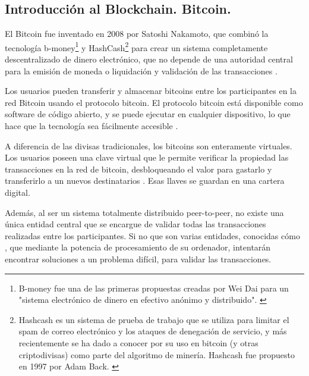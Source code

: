 \newpage

\subsection{Introducción al Blockchain. Bitcoin.}

El Bitcoin fue inventado en 2008 por Satoshi Nakamoto, que combinó la tecnología b-money\footnote{B-money 
fue una de las primeras propuestas creadas por Wei Dai para un "sistema electrónico de dinero en efectivo anónimo y 
distribuido". \label{fnlabel}} y HashCash\footnote{Hashcash es un sistema de prueba de trabajo que se utiliza para 
limitar el spam de correo electrónico y los ataques de denegación de servicio, y más recientemente se ha dado a 
conocer por su uso en bitcoin (y otras criptodivisas) como parte del algoritmo de minería. Hashcash fue propuesto 
en 1997 por Adam Back. \label{fnlabel}} para crear un sistema completamente descentralizado de dinero  electrónico, 
que no depende de una autoridad central para la emisión de moneda o liquidación y validación de las transacciones 
\cite{antonopoulos2014mastering, bmoney, hashcash}.

\vspace{5mm}

\noindent Los usuarios pueden transferir y almacenar bitcoins entre los participantes en la red Bitcoin usando el 
protocolo bitcoin. El protocolo bitcoin está disponible como software de código abierto, y se puede ejecutar en 
cualquier dispositivo, lo que hace que la tecnología sea fácilmente accesible \cite{antonopoulos2014mastering}.

\vspace{5mm}

\noindent A diferencia de las divisas tradicionales, los bitcoins son enteramente virtuales. Los usuarios poseen una 
clave virtual que le permite verificar la propiedad las transacciones en la red de bitcoin, desbloqueando el valor para 
gastarlo y transferirlo a un nuevos destinatarios \cite{antonopoulos2014mastering}. Esas llaves se guardan en una 
cartera digital. 

\vspace{5mm}

\noindent Además, al ser un sistema totalmente distribuido peer-to-peer, no existe una única entidad central que se 
encargue de validar todas las transacciones realizadas entre los participantes. Si no que son varias entidades, 
conocidas cómo , que mediante la potencia de procesamiento de su ordenador, intentarán encontrar 
soluciones a un problema difícil, para validar las transacciones.


